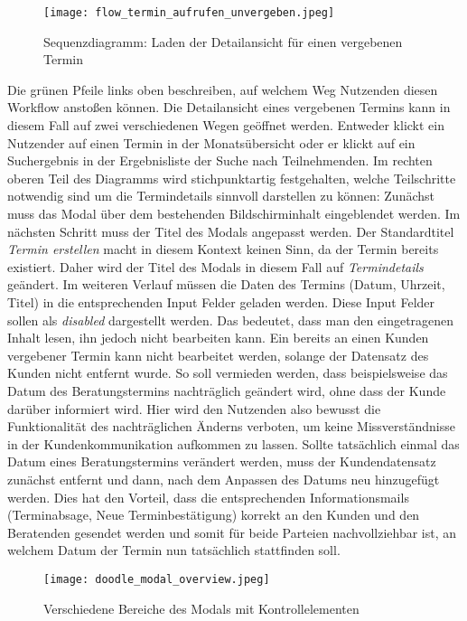 \begin{figure}[H]
    \caption{Sequenzdiagramm: Laden der Detailansicht für einen vergebenen Termin}
    \centering
    \texttt{[image: flow\_termin\_aufrufen\_unvergeben.jpeg]}
\end{figure}

Die grünen Pfeile links oben beschreiben, auf welchem Weg Nutzenden diesen
Workflow anstoßen können. Die Detailansicht eines vergebenen Termins kann in
diesem Fall auf zwei verschiedenen Wegen geöffnet werden. Entweder klickt ein
Nutzender auf einen Termin in der Monatsübersicht oder er klickt auf ein
Suchergebnis in der Ergebnisliste der Suche nach Teilnehmenden. Im rechten
oberen Teil des Diagramms wird stichpunktartig festgehalten, welche
Teilschritte notwendig sind um die Termindetails sinnvoll darstellen zu können:
Zunächst muss das \gls{Modal} über dem bestehenden Bildschirminhalt
eingeblendet werden. Im nächsten Schritt muss der Titel des Modals angepasst
werden. Der Standardtitel \textit{Termin erstellen} macht in diesem Kontext
keinen Sinn, da der Termin bereits existiert. Daher wird der Titel des Modals
in diesem Fall auf \textit{Termindetails} geändert. Im weiteren Verlauf müssen
die Daten des Termins (Datum, Uhrzeit, Titel) in die entsprechenden Input
Felder geladen werden. Diese Input Felder sollen als \textit{disabled}
dargestellt werden. Das bedeutet, dass man den eingetragenen Inhalt lesen, ihn
jedoch nicht bearbeiten kann. Ein bereits an einen Kunden vergebener Termin
kann nicht bearbeitet werden, solange der Datensatz des Kunden nicht entfernt
wurde. So soll vermieden werden, dass beispielsweise das Datum des
Beratungstermins nachträglich geändert wird, ohne dass der Kunde darüber
informiert wird. Hier wird den Nutzenden also bewusst die Funktionalität des
nachträglichen Änderns verboten, um keine Missverständnisse in der
Kundenkommunikation aufkommen zu lassen. Sollte tatsächlich einmal das Datum
eines Beratungstermins verändert werden, muss der Kundendatensatz zunächst
entfernt und dann, nach dem Anpassen des Datums neu hinzugefügt werden. Dies
hat den Vorteil, dass die entsprechenden Informationsmails (Terminabsage, Neue
Terminbestätigung) korrekt an den Kunden und den Beratenden gesendet werden und
somit für beide Parteien nachvollziehbar ist, an welchem Datum der Termin nun
tatsächlich stattfinden soll.

\begin{figure}[H]
    \caption{Verschiedene Bereiche des Modals mit Kontrollelementen}
    \centering
    \texttt{[image: doodle\_modal\_overview.jpeg]}
\end{figure}

